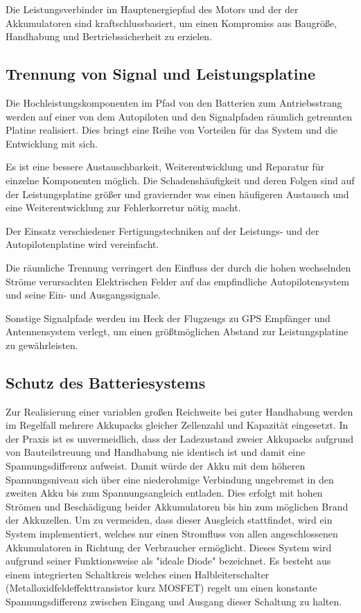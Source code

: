 Die Leistungsverbinder im Hauptenergiepfad des Motors und der der Akkumulatoren sind kraftschlussbasiert, um einen Kompromiss aus Baugröße, Handhabung und Bertriebssicherheit zu erzielen.

\subsection{Trennung von Signal und Leistungsplatine}

Die  Hochleistungskomponenten im Pfad von den Batterien zum Antriebsstrang werden auf einer von dem Autopiloten und den Signalpfaden räumlich getrennten Platine realisiert. Dies bringt eine Reihe von Vorteilen für das System und die Entwicklung mit sich.

Es ist eine bessere Austauschbarkeit, Weiterentwicklung und Reparatur für einzelne Komponenten möglich.
Die Schadenshäufigkeit und deren Folgen sind auf der Leistungsplatine größer und graviernder was einen häufigeren  Austausch und eine Weiterentwicklung zur Fehlerkorretur nötig macht.

Der Einsatz verschiedener Fertigungstechniken auf der Leistungs- und der Autopilotenplatine wird vereinfacht.

Die räumliche Trennung verringert den Einfluss der durch die hohen wechselnden Ströme verursachten Elektrischen Felder auf das empfindliche Autopilotensystem und seine Ein- und Ausgangssignale.

Sonstige Signalpfade werden im Heck der Flugzeugs zu GPS Empfänger und Antennensystem verlegt, um einen größtmöglichen Abstand zur Leistungsplatine zu gewährleisten.

\subsection{Schutz des Batteriesystems}

Zur Realisierung einer variablen großen Reichweite bei guter Handhabung werden im Regelfall mehrere Akkupacks gleicher Zellenzahl und Kapazität eingesetzt.
In der Praxis ist es unvermeidlich, dass der Ladezustand zweier Akkupacks aufgrund von Bauteilstreuung und Handhabung nie identisch ist und damit eine Spannungsdifferenz aufweist. Damit würde der Akku mit dem höheren Spannungsniveau sich über eine niederohmige Verbindung ungebremst in den zweiten Akku bis zum Spannungsangleich entladen. Dies erfolgt mit  hohen Strömen und Beschädigung beider Akkumulatoren bis hin zum möglichen Brand der Akkuzellen.
Um zu vermeiden, dass dieser Ausgleich stattfindet, wird ein System implementiert, welches nur einen Stromfluss von allen angeschlossenen Akkumulatoren in Richtung der Verbraucher ermöglicht.
Dieses System wird aufgrund seiner Funktionsweise als "ideale Diode" bezeichnet. Es besteht aus einem integrierten Schaltkreis welches einen Halbleiterschalter (Metalloxidfeldeffekttransistor kurz MOSFET) regelt um einen konstante Spannungsdifferenz zwischen Eingang und Ausgang dieser Schaltung zu halten.

